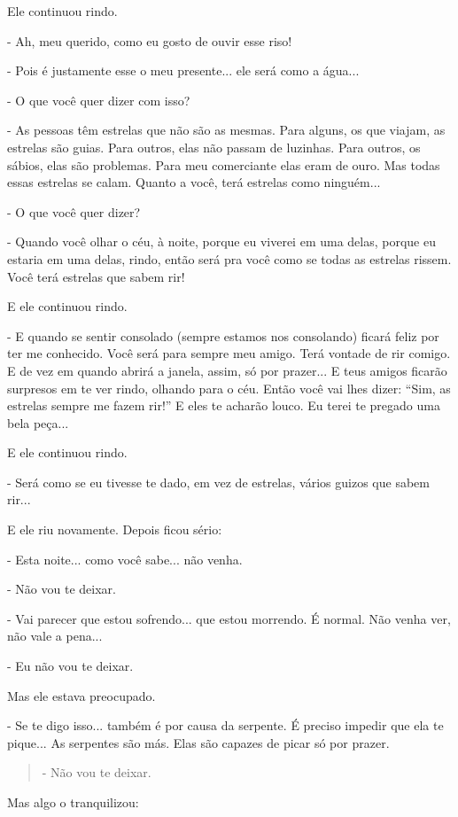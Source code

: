 Ele continuou rindo.

- Ah, meu querido, como eu gosto de ouvir esse riso!

- Pois é justamente esse o meu presente... ele será como a água...

- O que você quer dizer com isso?

- As pessoas têm estrelas que não são as mesmas. Para alguns, os que
viajam, as estrelas são guias. Para outros, elas não passam de luzinhas.
Para outros, os sábios, elas são problemas. Para meu comerciante elas
eram de ouro. Mas todas essas estrelas se calam. Quanto a você, terá
estrelas como ninguém...

- O que você quer dizer?

- Quando você olhar o céu, à noite, porque eu viverei em uma delas,
porque eu estaria em uma delas, rindo, então será pra você como se todas
as estrelas rissem. Você terá estrelas que sabem rir!

E ele continuou rindo.

- E quando se sentir consolado (sempre estamos nos consolando) ficará
feliz por ter me conhecido. Você será para sempre meu amigo. Terá
vontade de rir comigo. E de vez em quando abrirá a janela, assim, só por
prazer... E teus amigos ficarão surpresos em te ver rindo, olhando para
o céu. Então você vai lhes dizer: ``Sim, as estrelas sempre me fazem
rir!'' E eles te acharão louco. Eu terei te pregado uma bela peça...

E ele continuou rindo.

- Será como se eu tivesse te dado, em vez de estrelas, vários guizos que
sabem rir...

E ele riu novamente. Depois ficou sério:

- Esta noite... como você sabe... não venha.

- Não vou te deixar.

- Vai parecer que estou sofrendo... que estou morrendo. É normal. Não
venha ver, não vale a pena...

- Eu não vou te deixar.

Mas ele estava preocupado.

- Se te digo isso... também é por causa da serpente. É preciso impedir
que ela te pique... As serpentes são más. Elas são capazes de picar só
por prazer.

\begin{quote}
- Não vou te deixar.
\end{quote}

Mas algo o tranquilizou:

